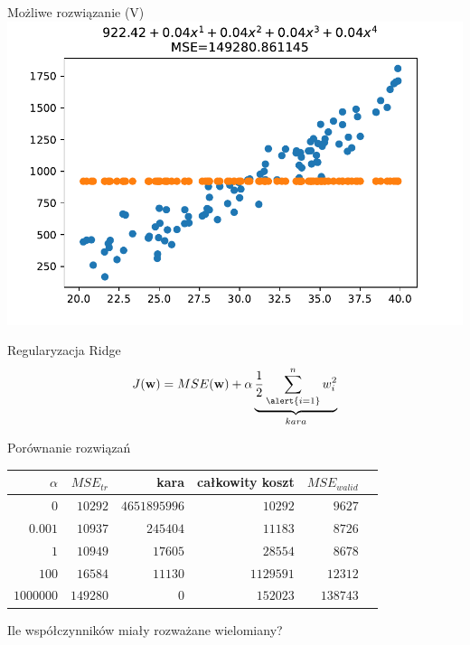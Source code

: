 \documentclass{sa}
\renewcommand{\vec}[1]{\ensuremath\mathbf{#1}}
\begin{document}
\begin{frame}{Możliwe rozwiązanie (V)}
\includegraphics[width=\textwidth]{reg-2deg-with-noise-ridge1000000.pdf}
\end{frame}

\begin{frame}{Regularyzacja Ridge}
\[ J(\vec{w}) = MSE(\vec{w}) + \alpha \underbrace{\frac{1}{2}\sum_{\alert{i=1}}^n w_i^2}_{kara} \]
\end{frame}

\begin{frame}{Porównanie rozwiązań}
\centering
\begin{tabular}{rrrrrr}
$\alpha$ & $MSE_{tr}$  & kara  & całkowity koszt & $MSE_{walid}$ \\
\hline
$0$ & $10292$ & $4651895996$ & $10292$ & $9627$\\
$0.001$ & $10937$ & $245404$ & $11183$ & $8726$\\
$1$ & $10949$ & $17605$ & $28554$ & $8678$\\
$100$ & $16584$ & $11130$ & $1129591$ & $12312$\\
$1000000$ & $149280$ & $0$ & $152023$ & $138743$\\
\end{tabular}

\pause
\vfill
\alert{Ile współczynników miały rozważane wielomiany?}
\end{frame}
\end{document}
